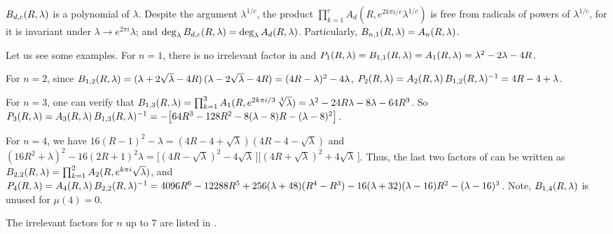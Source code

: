 \documentclass[twocolumn]{revtex4-1}
\begin{document}
\begin{remark}[2]
$B_{d,c}(R, \lambda)$ is a polynomial of $\lambda$.
Despite the argument $\lambda^{1/c}$,
  the product $\prod_{k=1}^c A_d(R, e^{2k\pi i/c} \lambda^{1/c})$
  is free from radicals of powers of $\lambda^{1/c}$,
  for it is invariant under $\lambda \rightarrow e^{2\pi i} \lambda$;
and $\deg_\lambda B_{d,c}(R, \lambda) = \deg_\lambda A_d(R, \lambda)$.
Particularly, $B_{n,1}(R, \lambda) = A_n(R, \lambda)$.
\end{remark}




Let us see some examples.
%
For $n = 1$,
there is no irrelevant factor
in  and
$P_1(R, \lambda) = B_{1,1}(R, \lambda) = A_1(R, \lambda) = \lambda^2 - 2\lambda - 4R$.



For $n = 2$, since
$B_{1,2}(R, \lambda)
=
(\lambda +2\sqrt{\lambda} - 4R)
\,
(\lambda -2\sqrt{\lambda} - 4R)
=(4R-\lambda)^2 -4\lambda$,
%
$P_2(R, \lambda) = A_2(R, \lambda) \, B_{1,2}(R, \lambda)^{-1} = 4R - 4 + \lambda$.



For $n = 3$,
one can verify that
$B_{1,3}(R, \lambda)
= \prod_{k=1}^3 A_1(R, e^{2k\pi i/3} \, \sqrt[3]{\lambda})
=  \lambda^2 - 24 R \lambda - 8 \lambda - 64 R^3$.
%
So
$P_3(R, \lambda) = A_3(R, \lambda) \, B_{1,3}(R, \lambda)^{-1}
= -\big[64 R^3- 128 R^2 -8(\lambda -8)R-(\lambda-8)^2\big]$.



For $n = 4$,
we have
$16 (R-1)^2 - \lambda
= (4R - 4 + \sqrt{\lambda})(4R - 4 - \sqrt{\lambda})$
and
$
(16 R^2 + \lambda)^2 - 16 (2R+1)^2 \lambda
=
\big[(4R - \sqrt{\lambda})^2  - 4\sqrt{\lambda}\,\big]
\big[(4R + \sqrt{\lambda})^2  + 4\sqrt{\lambda}\,\big]$.
Thus, the last two factors of 
can be written as
$B_{2,2}(R, \lambda) = \prod_{k=1}^2 A_2(R, e^{k \pi i} \sqrt{\lambda})$,
and
%
$P_4(R, \lambda)
    = A_4(R, \lambda) \, B_{2,2}(R, \lambda)^{-1}
    = 4096 R^6-12288 R^5+ 256 (\lambda + 48) (R^4- R^3)
    -16(\lambda + 32)(\lambda - 16) R^2 - (\lambda-16)^3$.
Note, $B_{1,4}(R, \lambda)$ is unused for $\mu(4) = 0$.


The irrelevant factors for $n$ up to 7 are listed in .



\newcommand{\T}{{R_4}}
\end{document}
